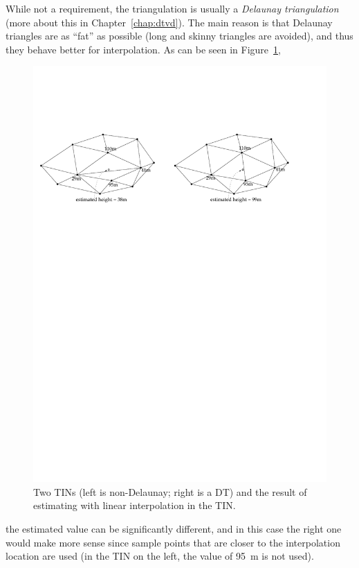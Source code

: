 While not a requirement, the triangulation is usually a \emph{Delaunay triangulation} (more about this in Chapter~\ref{chap:dtvd}).%
The main reason is that Delaunay triangles are as ``fat'' as possible (long and skinny triangles are avoided), and thus they behave better for interpolation.
As can be seen in Figure~\ref{fig:whydt},
\begin{figure}
  \centering
  \includegraphics[width=\linewidth]{figs/whydt}
  \caption{Two TINs (left is non-Delaunay; right is a DT) and the result of estimating with linear interpolation in the TIN\@.}%
\label{fig:whydt}
\end{figure}
the estimated value can be significantly different, and in this case the right one would make more sense since sample points that are closer to the interpolation location are used (in the TIN on the left, the value of \qty{95}{\m} is not used).

